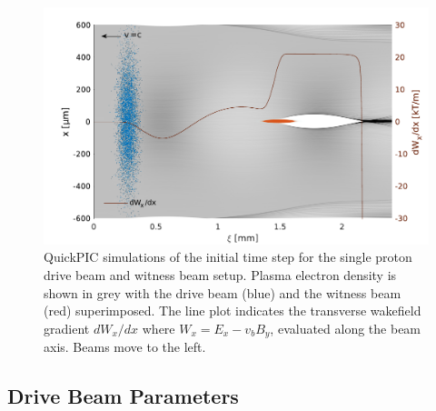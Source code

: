 \documentclass[aps,prstab,reprint,amsmath,amssymb,groupedaddress]{revtex4-1}
\begin{document}
\begin{figure}[hbt]
    \includegraphics[width=\linewidth,trim={2mm 0mm 2mm 0mm},clip]{figures/plasmaDenTWake}
    \caption{\label{Fig:PlasmaDenTWake} QuickPIC simulations of the initial time step for the single proton drive beam
        and witness beam setup. Plasma electron density is shown in grey with the drive beam (blue) and the witness beam
        (red) superimposed. The line plot indicates the transverse wakefield gradient $dW_{x}/dx$ where
        $W_{x} = E_{x} - v_{b} B_{y}$, evaluated along the beam axis. Beams move to the left.}
\end{figure}

\subsection{Drive Beam Parameters}\label{S:M:Setup}

\end{document}
